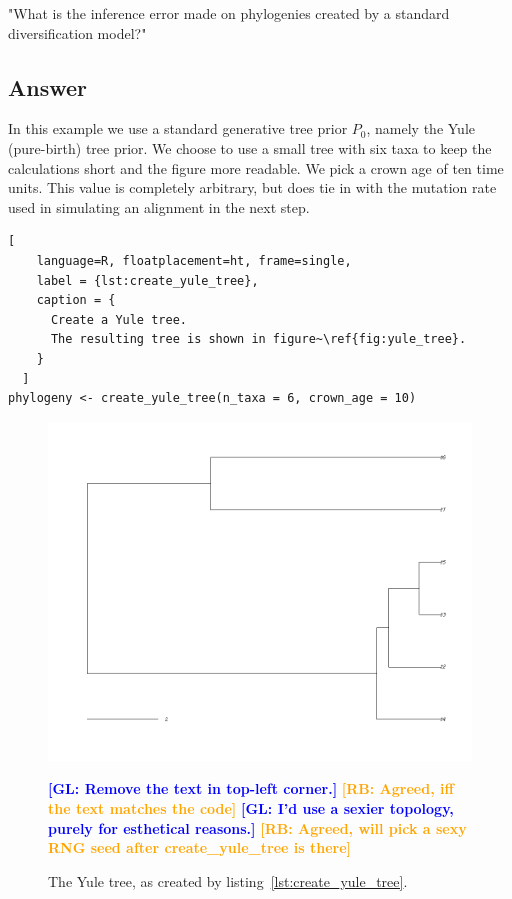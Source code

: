 \documentclass{article}
\newcommand{\giovanni}[1]{\textcolor{blue}{\textbf{[GL: #1]}}}
\newcommand{\richel}[1]{\textcolor{orange}{\textbf{[RB: #1]}}}
\begin{document}
"What is the inference error made on phylogenies
created by a standard diversification model?"

\subsection{Answer}

In this example we use a standard generative tree prior $\mathit{P_{0}}$, 
namely the Yule (pure-birth) tree prior. 
We choose to use a small tree with six taxa to keep
the calculations short and the figure more readable.
We pick a crown age of ten time units. This value is 
completely arbitrary, but does tie in with the mutation rate 
used in simulating an alignment in the next step.

\begin{lstlisting}[
    language=R, floatplacement=ht, frame=single, 
    label = {lst:create_yule_tree}, 
    caption = {
      Create a Yule tree. 
      The resulting tree is shown in figure~\ref{fig:yule_tree}.
    }
  ]
phylogeny <- create_yule_tree(n_taxa = 6, crown_age = 10)
\end{lstlisting}

\begin{figure}[ht]
  \includegraphics[width=\textwidth]{example_1/true_tree.png}
  \caption{The Yule tree, as created by listing~\ref{lst:create_yule_tree}.}
  \label{fig:yule_tree}
  \giovanni{Remove the text in top-left corner.}
  \richel{Agreed, iff the text matches the code}
  \giovanni{I'd use a sexier topology, purely for esthetical reasons.}
  \richel{Agreed, will pick a sexy RNG seed after create\_yule\_tree is there}
\end{figure}
\end{document}
